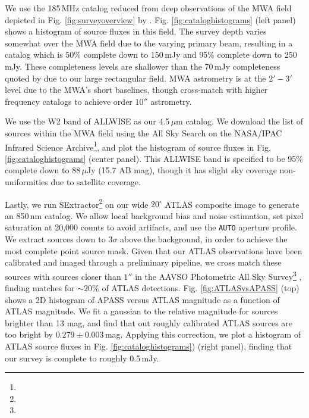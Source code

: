 \documentclass[numberedappendix]{emulateapj}
\begin{document}
We use the 185\,MHz catalog reduced from deep observations of the MWA field depicted in Fig. \ref{fig:surveyoverview} by \citet{PattiCatalog1}. Fig. \ref{fig:cataloghistograms} (left panel) shows a histogram of source fluxes in this field. The survey depth varies somewhat over the MWA field due to the varying primary beam, resulting in a catalog which is 50\% complete down to 150\,mJy and 95\% complete down to 250\,mJy. These completeness levels are shallower than the 70\,mJy completeness quoted by \citet{PattiCatalog1} due to our large rectangular field. MWA astrometry is at the $2'-3'$ level due to the MWA's short baselines, though \citep{PattiCatalog1} cross-match with higher frequency catalogs to achieve order $10''$ astrometry. 

We use the W2 band of ALLWISE \citep{Wright2010,allwise} as our 4.5\,$\mu$m catalog. We download the list of sources within the MWA field using the All Sky Search on the NASA/IPAC Infrared Science Archive\footnote{}, and plot the histogram of source fluxes in Fig. \ref{fig:cataloghistograms} (center panel). This ALLWISE band is specified to be 95\% complete down to 88\,$\mu$Jy (15.7 AB mag), though it has slight sky coverage non-uniformities due to satellite coverage.

Lastly, we run SExtractor\footnote{} \citep{sextractor} on our wide $20^\circ$ ATLAS composite image to generate an 850\,nm catalog. We allow local background bias and noise estimation, set pixel saturation at 20,000 counts to avoid artifacts, and use the {\tt AUTO} aperture profile. We extract sources down to $3\sigma$ above the background, in order to achieve the most complete point source mask. Given that our ATLAS observations have been calibrated and imaged through a preliminary pipeline, we cross match these sources with sources closer than $1''$ in the AAVSO Photometric All Sky Survey\footnote{} \citep{apass}, finding matches for $\sim20\%$ of ATLAS detections. Fig. \ref{fig:ATLASvsAPASS} (top) shows a 2D histogram of APASS versus ATLAS magnitude as a function of ATLAS magnitude. We fit a gaussian to the relative magnitude for sources brighter than 13 mag, and find that out roughly calibrated ATLAS sources are too bright by $0.279\pm0.003$\,mag. Applying this correction, we plot a histogram of ATLAS source fluxes in Fig. \ref{fig:cataloghistograms}) (right panel), finding that our survey is complete to roughly 0.5\,mJy.
\end{document}
